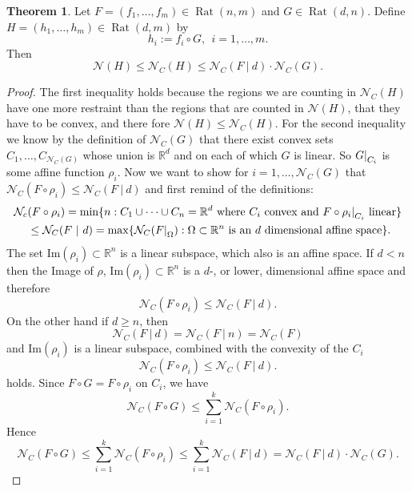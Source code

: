 \documentclass{article}
\theoremstyle{definition}
\newtheorem{theorem}{Theorem}[section]
\DeclareMathOperator{\Rat}{Rat}
\newcommand\restr[2]{{%
  \left.\kern-\nulldelimiterspace %
  #1 %
  \right|_{#2} %
  }}
\begin{document}
\begin{theorem}\hspace{1sp}\cite{maclagan2015introduction}\label{theo:inequal}
Let $F=(f_1, \dots , f_m) \in \Rat(n,m)$ and $G \in \Rat(d, n)$. Define $H = (h_1, \dots , h_m) \in \Rat(d, m)$ by
$$h_i := f_i \circ G, \ \ i=1, \dots , m.$$
Then
$$\mathcal{N}(H) \leq \mathcal{N}_{C}(H) \leq \mathcal{N}_C(F \ | \ d) \cdot \mathcal{N}_C(G).$$
\end{theorem}
\begin{proof}
The first inequality holds because the regions we are counting in $\mathcal{N}_{C}(H)$ have one more restraint than the regions that are counted in $\mathcal{N}(H)$, that they have to be convex, and there fore $\mathcal{N}(H) \leq \mathcal{N}_{C}(H)$. For the second inequality we know by the definition of $\mathcal{N}_C(G)$ that there exist convex sets $C_1, \dots , C_{\mathcal{N}_C(G)}$ whose union is $\mathbb{R}^{d}$ and on each of which $G$ is linear. So $\restr{G}{C_i}$ is some affine function $\rho_i$. Now we want to show for $i = 1, \dots, \mathcal{N}_C(G)$ that $\mathcal{N}_C(F \circ \rho_i) \leq \mathcal{N}_C(F \ | \ d)$ and first remind of the definitions:
\begin{align*}
\mathcal{N}_{c}&(F \circ \rho_i) = \min\{n : C_1 \cup \dots \cup C_n = \mathbb{R}^{d} \ \text{where} \ C_i \ \text{convex and} \ \restr{F \circ \rho_i}{C_i} \ \text{linear}\} \\
&\leq \mathcal{N}_C(F \ | \ d) = \max\{\mathcal{N}_C(\restr{F}{\Omega}) : \Omega \subset \mathbb{R}^{n} \ \text{is an} \ d \ \text{dimensional affine space} \}.
\end{align*}
The set $\text{Im}(\rho_i) \subset \mathbb{R}^{n}$ is a linear subspace, which also is an affine space. If $d < n$ then the Image of $\rho$, $\text{Im}(\rho_i) \subset \mathbb{R}^{n}$ is a $d$-, or lower, dimensional affine space and therefore 
$$\mathcal{N}_C(F \circ \rho_i) \leq \mathcal{N}_C(F \ | \ d).$$ 
On the other hand if $d \geq n$, then 
$$\mathcal{N}_C(F \ | \ d) = \mathcal{N}_C(F \ | \ n) = \mathcal{N}_C(F)$$ 
and $\text{Im}(\rho_i)$ is a linear subspace, combined with the convexity of the $C_i$
$$\mathcal{N}_C(F \circ \rho_i) \leq \mathcal{N}_C(F \ | \ d).$$
holds. Since $F \circ G = F \circ \rho_i$ on $C_i$, we have
$$\mathcal{N}_C(F \circ G) \leq \displaystyle\sum_{i=1}^{k} \mathcal{N}_C(F \circ \rho_i).$$
Hence
$$\mathcal{N}_C(F \circ G) \leq \displaystyle\sum_{i=1}^{k} \mathcal{N}_C(F \circ \rho_i) \leq \displaystyle\sum_{i=1}^{k} \mathcal{N}_C(F \ | \ d) = \mathcal{N}_C(F \ | \ d) \cdot \mathcal{N}_C(G).$$
\end{proof}
\end{document}
